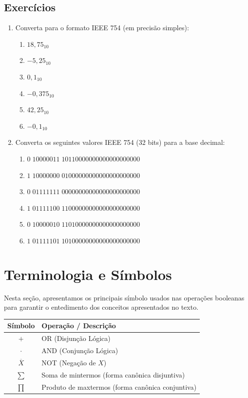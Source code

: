 \documentclass[12pt]{article}
\begin{document}
\subsection{Exercícios}
\begin{enumerate}
    \item Converta para o formato IEEE 754 (em precisão simples):
        \begin{enumerate}
            \item $18,75_{10}$
            \item $-5,25_{10}$
            \item $0,1_{10}$
            \item $-0,375_{10}$
            \item $42,25_{10}$
            \item $-0,1_{10}$
        \end{enumerate}
    \item Converta os seguintes valores IEEE 754 (32 bits) para a base decimal:
        \begin{enumerate}
            \item $0 \; 10000011 \; 10110000000000000000000$
            \item $1 \; 10000000 \; 01000000000000000000000$
            \item $0 \; 01111111 \; 00000000000000000000000$
            \item $1 \; 01111100 \; 11000000000000000000000$
            \item $0 \; 10000010 \; 11010000000000000000000$
            \item $1 \; 01111101 \;  10100000000000000000000$
        \end{enumerate}
\end{enumerate}

\section{Terminologia e Símbolos}
Nesta seção, apresentamos os principais símbolo usados nas operações booleanas para garantir o entedimento dos conceitos apresentados no texto. 
\begin{center}
\begin{tabular}{|c|l|}
\hline
\textbf{Símbolo} & \textbf{Operação / Descrição} \\
\hline
$+$ & OR (Disjunção Lógica) \\
$\cdot$ & AND (Conjunção Lógica) \\
$\overline{X}$ & NOT (Negação de $X$) \\
$\sum$ & Soma de mintermos (forma canônica disjuntiva) \\
$\prod$ & Produto de maxtermos (forma canônica conjuntiva) \\
\hline
\end{tabular}
\end{center}
\end{document}
